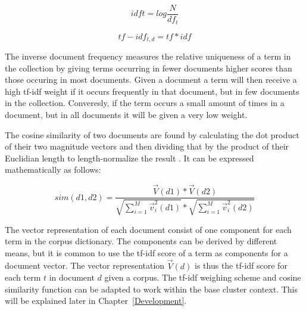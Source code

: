 \begin{displaymath}
idf{t} = log \frac{N}{df_{t}} 
\end{displaymath}

\begin{displaymath}
tf-idf_{t,d} = tf * idf
\end{displaymath}

The inverse document frequency measures the relative uniqueness of a term in the collection by giving terms occurring in fewer documents higher scores than those occuring in most documents. Given a document a term will then receive a high tf-idf weight if it occurs frequently in that document, but in few documents in the collection. Converesly, if the term occurs a small amount of times in a document, but in all documents it will be given a very low weight.

The cosine similarity of two documents are found by calculating the dot product of their two magnitude vectors and then dividing that by the product of their Euclidian length to length-normalize the result \cite{Manning2009a}. It can be expressed mathematically as follows:

\begin{displaymath}
sim(d1, d2) = \frac{\vec{V}(d1) * \vec{V}(d2)}
{\sqrt{\sum_{i = 1}^M\vec{v}_{i}^2(d1)} * \sqrt{\sum_{i = 1}^M\vec{v}_{i}^2(d2)}}
\end{displaymath}

The vector representation of each document consist of one component for each term in the corpus dictionary. The components can be derived by different means, but it is common to use the tf-idf score of a term as components for a document vector. The vector representation \(\vec{V}(d)\) is thus the tf-idf score for each term \(t\) in document \(d\) given a corpus. The tf-idf weighing scheme and cosine similarity function can be adapted to work within the base cluster context. This will be explained later in Chapter~\ref{Development}.

